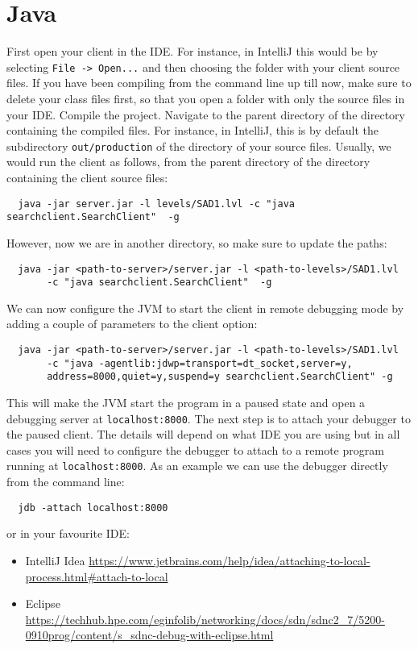 \documentclass[10pt,a4paper]{article}
\begin{document}
\section{Java}
First open your client in the IDE. For instance, in IntelliJ this would be by selecting \texttt{File -> Open...} and then choosing the folder with your client source files. If you have been compiling from the command line up till now, make sure to delete your class files first, so that you open a folder with only the source files in your IDE. Compile the project. Navigate to the parent directory of the directory containing the compiled files. For instance, in IntelliJ, this is by default the subdirectory \texttt{out/production} of the directory of your source files.
Usually, we would run the client as follows, from the parent directory of the directory containing the client source files:
\begin{verbatim}
  java -jar server.jar -l levels/SAD1.lvl -c "java searchclient.SearchClient"  -g
\end{verbatim}
However, now we are in another directory, so make sure to update the paths:
\begin{verbatim}
  java -jar <path-to-server>/server.jar -l <path-to-levels>/SAD1.lvl
       -c "java searchclient.SearchClient"  -g
\end{verbatim}
We can now configure the JVM to start the client in remote debugging mode by adding a couple of parameters to the client option:
\begin{verbatim}
  java -jar <path-to-server>/server.jar -l <path-to-levels>/SAD1.lvl
       -c "java -agentlib:jdwp=transport=dt_socket,server=y,
       address=8000,quiet=y,suspend=y searchclient.SearchClient" -g
\end{verbatim}
This will make the JVM start the program in a paused state and open a debugging server at \texttt{localhost:8000}.
The next step is to attach your debugger to the paused client. The details will depend on what IDE you are using but in all cases you will need to configure the debugger to attach to a remote program running at \texttt{localhost:8000}.
As an example we can use the debugger directly from the command line:
\begin{verbatim}
  jdb -attach localhost:8000
\end{verbatim}
or in your favourite IDE:
\begin{itemize}
\item IntelliJ Idea
\newline
\url{https://www.jetbrains.com/help/idea/attaching-to-local-process.html#attach-to-local}
\item Eclipse \newline
\url{https://techhub.hpe.com/eginfolib/networking/docs/sdn/sdnc2_7/5200-0910prog/content/s_sdnc-debug-with-eclipse.html}
\end{itemize}
\end{document}
